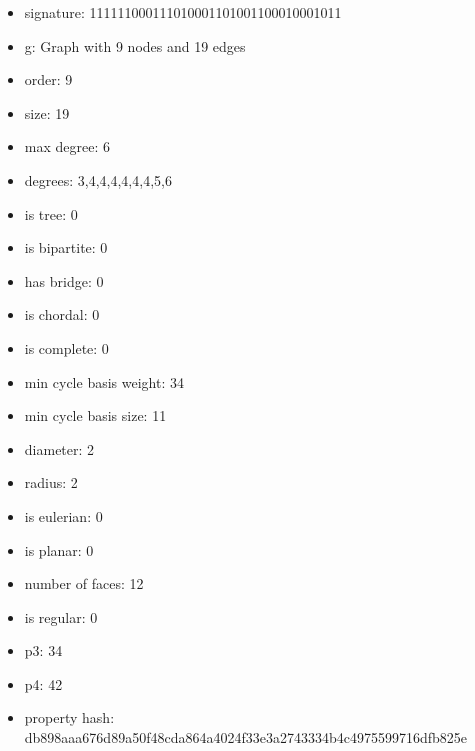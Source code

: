 \newpage
\begin{figure}
\end{figure}
\begin{itemize}
\item signature: 111111000111010001101001100010001011
\item g: Graph with 9 nodes and 19 edges
\item order: 9
\item size: 19
\item max degree: 6
\item degrees: 3,4,4,4,4,4,4,5,6
\item is tree: 0
\item is bipartite: 0
\item has bridge: 0
\item is chordal: 0
\item is complete: 0
\item min cycle basis weight: 34
\item min cycle basis size: 11
\item diameter: 2
\item radius: 2
\item is eulerian: 0
\item is planar: 0
\item number of faces: 12
\item is regular: 0
\item p3: 34
\item p4: 42
\item property hash: db898aaa676d89a50f48cda864a4024f33e3a2743334b4c4975599716dfb825e
\end{itemize}
